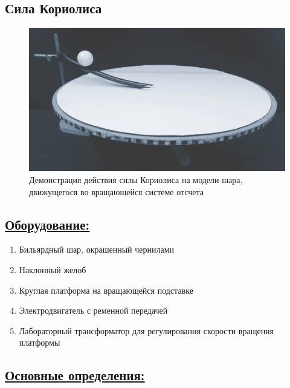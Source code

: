 \documentclass[14pt,a4paper,oneside]{extarticle}	%
\begin{document}
	

	\begin{center}
		\subsection*{Сила Кориолиса}
	\end{center}	

\begin{figure}[H] 	
	\centering 	
	\includegraphics[width=0.9\linewidth]{Coriolis-1.png}
	\caption{Демонстрация действия силы Кориолиса на модели шара, движущегося во вращающейся системе отсчета}
	\label{Coriolis-1}
\end{figure}
	
	\subsection*{\underline{Оборудование:}}

		\begin{enumerate}
			\item Бильярдный шар, окрашенный чернилами
			\item Наклонный желоб
			\item Круглая платформа на вращающейся подставке
			\item Электродвигатель с ременной передачей
			\item Лабораторный трансформатор для регулирования скорости вращения платформы
		\end{enumerate}

\newpage
		\subsection*{\underline{Основные определения:}}
		
\end{document}

